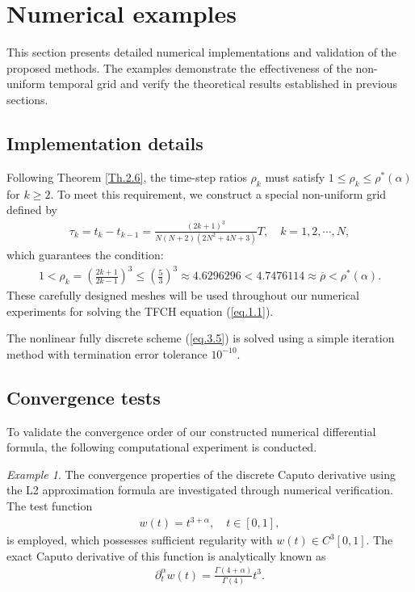 \documentclass{siamart171218}
\theoremstyle{remark}
\theoremstyle{example}
\newtheorem*{example}{Example}  %
\numberwithin{equation}{section}
\begin{document}
\section{Numerical examples}\label{sec: Numerical examples}
This section presents detailed numerical implementations and validation of the proposed methods. The examples demonstrate the effectiveness of the non-uniform temporal grid and verify the theoretical results established in previous sections.


\subsection{Implementation details}

Following Theorem \ref{Th.2.6}, the time-step ratios $\rho_{k}$ must satisfy $1 \leq \rho_{k} \leq \rho^*(\alpha)$ for $k\ge 2$. To meet this requirement, we construct a special non-uniform grid defined by
\begin{align*}
\tau_k=t_{k}-t_{k-1}=\frac{(2k+1)^3}{N(N+2)(2N^2+4N+3)}T, \quad k=1,2,\cdots,N,
\end{align*}
which guarantees the condition:
\begin{align*}
1 < \rho_{k} = \left(\frac{2k+1}{2k-1}\right)^3 \leq \left(\frac{5}{3}\right)^3 \approx 4.6296296 < 4.7476114 \approx \overline{\rho} < \rho^*(\alpha).
\end{align*}
 These carefully designed meshes will be used throughout our numerical experiments for solving the TFCH equation (\ref{eq.1.1}).

 The nonlinear fully discrete scheme (\ref{eq.3.5}) is solved using a simple iteration method with termination error tolerance $10^{-10}$.


\subsection{Convergence tests}

To validate the convergence order of our constructed numerical differential formula,
the following computational experiment is conducted.

\begin{example}\label{ex.5.1}
The convergence properties of the discrete Caputo derivative using the L2 approximation formula are investigated through numerical verification. The test function
\begin{align*}
w(t) = t^{3+\alpha},\quad t\in [0,1],
\end{align*}
is employed, which possesses sufficient regularity with $w(t) \in C^3[0, 1]$. The exact Caputo derivative of this function is analytically known as
\begin{align*}
\partial^\alpha_t w(t)=\frac{\Gamma(4+\alpha)}{\Gamma(4)}t^3.
\end{align*}
\end{example}
\end{document}
